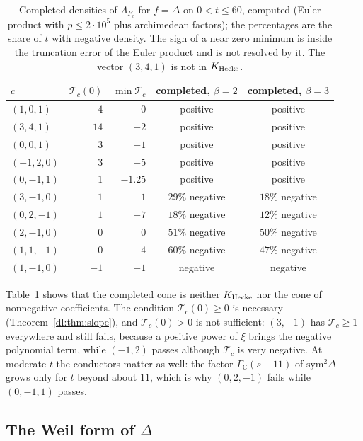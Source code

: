 \begin{table}[h]
\centering\footnotesize
\begin{tabular}{lrrcc}
\toprule
$c$ & $\mathcal T_c(0)$ & $\min\mathcal T_c$ & completed, $\beta=2$ & completed, $\beta=3$\\
\midrule
$(1,0,1)$ & $4$ & $0$ & positive & positive\\
$(3,4,1)$ & $14$ & $-2$ & positive & positive\\
$(0,0,1)$ & $3$ & $-1$ & positive & positive\\
$(-1,2,0)$ & $3$ & $-5$ & positive & positive\\
$(0,-1,1)$ & $1$ & $-1.25$ & positive & positive\\
$(3,-1,0)$ & $1$ & $1$ & $29\%$ negative & $18\%$ negative\\
$(0,2,-1)$ & $1$ & $-7$ & $18\%$ negative & $12\%$ negative\\
$(2,-1,0)$ & $0$ & $0$ & $51\%$ negative & $50\%$ negative\\
$(1,1,-1)$ & $0$ & $-4$ & $60\%$ negative & $47\%$ negative\\
$(1,-1,0)$ & $-1$ & $-1$ & negative & negative\\
\bottomrule
\end{tabular}
\caption{Completed densities of $\Lambda_{F_c}$ for $f=\Delta$ on $0<t\le60$, computed (Euler product with $p\le2\cdot10^5$ plus archimedean factors); the percentages are the share of $t$ with negative density. The sign of a near zero minimum is inside the truncation error of the Euler product and is not resolved by it. The vector $(3,4,1)$ is not in $K_{\rm Hecke}$.}
\label{dl:tab:completed}
\end{table}

Table~\ref{dl:tab:completed} shows that the completed cone is neither $K_{\rm Hecke}$ nor the cone of nonnegative coefficients. The condition $\mathcal T_c(0)\ge0$ is necessary (Theorem~\ref{dl:thm:slope}), and $\mathcal T_c(0)>0$ is not sufficient: $(3,-1)$ has $\mathcal T_c\ge1$ everywhere and still fails, because a positive power of $\xi$ brings the negative polynomial term, while $(-1,2)$ passes although $\mathcal T_c$ is very negative. At moderate $t$ the conductors matter as well: the factor $\Gamma_{\mathbb C}(s+11)$ of $\mathrm{sym}^2\Delta$ grows only for $t$ beyond about $11$, which is why $(0,2,-1)$ fails while $(0,-1,1)$ passes.

\subsection{The Weil form of $\Delta$}\label{dl:sec:weil}

